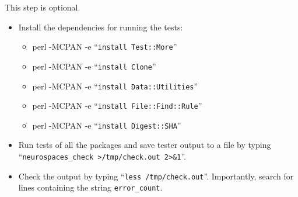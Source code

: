 \documentclass[12pt]{article}
\begin{document}
This step is optional.

\begin{itemize}
   \item[] Install the dependencies for running the tests:
      \begin{itemize}
         \item perl -MCPAN -e ``{\tt install Test::More}''
         \item perl -MCPAN -e ``{\tt install Clone}''
         \item perl -MCPAN -e ``{\tt install Data::Utilities}''
         \item perl -MCPAN -e ``{\tt install File::Find::Rule}''
         \item perl -MCPAN -e ``{\tt install Digest::SHA}''
      \end{itemize}
      
   \item[] Run tests of all the packages and save tester output to a file  by typing ``{\tt neurospaces\_check >/tmp/check.out 2>\&1}''.
   \item[] Check the output by typing ``{\tt less /tmp/check.out}''. Importantly, search for lines containing the string {\tt error\_count}.
\end{itemize}
 
\end{document}

